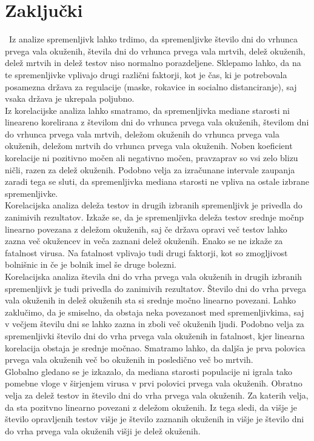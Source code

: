 \documentclass[a4paper,11pt]{article}
\begin{document}
\section{Zaključki}\
Iz analize spremenljivk lahko trdimo, da spremenljivke število dni do vrhunca prvega vala okuženih, števila dni do vrhunca prvega vala mrtvih, delež okuženih, delež mrtvih in delež testov niso normalno porazdeljene. Sklepamo lahko, da na te spremenljivke vplivajo drugi različni faktorji, kot je čas, ki je potrebovala posamezna država za regulacije (maske, rokavice in socialno distanciranje), saj vsaka država je ukrepala poljubno. \\
Iz korelacijske analiza lahko smatramo, da spremenljivka mediane starosti ni lineareno korelirana z številom dni do vrhunca prvega vala okuženih, številom dni do vrhunca prvega vala mrtvih, deležom okuženih do vrhunca prvega vala okuženih, deležom mrtvih do vrhunca prvega vala okuženih. Noben koeficient korelacije ni pozitivno močen ali negativno močen, pravzaprav so vsi zelo blizu ničli, razen za delež okuženih. Podobno velja za izračunane intervale zaupanja zaradi tega se sluti, da spremenljivka mediana starosti ne vpliva na ostale izbrane spremenljivke. \\
Korelacijska analiza deleža testov in drugih izbranih spremenljivk je privedla do zanimivih rezultatov. Izkaže se, da je spremenljivka deleža testov srednje močnp linearno povezana z deležom okuženih, saj če država opravi več testov lahko zazna več okužencev in veča zaznani delež okuženih. Enako se ne izkaže za fatalnost virusa. Na fatalnost vplivajo tudi drugi faktorji, kot so zmogljivost bolnišnic in če je bolnik imel še druge bolezni. \\
Korelacijska analiza števila dni do vrha prvega vala okuženih in drugih izbranih spremenljivk je tudi privedla do zanimivih rezultatov. Število dni do vrha prvega vala okuženih in delež okuženih sta si srednje močno linearno povezani. Lahko zaklučimo, da je smiselno, da obstaja neka povezanost med spremenljivkima, saj v večjem številu dni se lahko zazna in zboli več okuženih ljudi. Podobno velja za spremenljivki število dni do vrha prvega vala okuženih in fatalnost, kjer linearna korelacija obstaja je srednje močnao. Smatramo lahko, da daljša je prva polovica prvega vala okuženih več bo okuženih in posledično več bo mrtvih. \\
Globalno gledano se je izkazalo, da mediana starosti populacije ni igrala tako pomebne vloge v širjenjem virusa v prvi polovici prvega vala okuženih. Obratno velja za delež testov in število dni do vrha prvega vala okuženih. Za katerih velja, da sta pozitvno linearno povezani z deležom okuženih. Iz tega sledi, da višje je število opravljenih testov višje je število zaznanih okuženih in višje je število dni do vrha prvega vala okuženih višji je delež okuženih.
\end{document}
